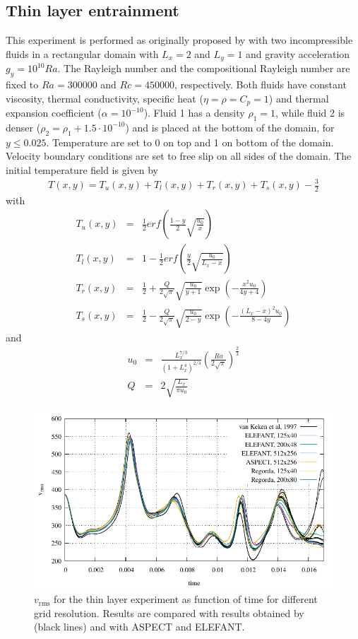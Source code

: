 \subsection{Thin layer entrainment}\label{sec:thin}
This experiment is performed as originally proposed by \citet{vanKeken1997} with two incompressible fluids in a rectangular domain with $L_x=2$ and $L_y=1$
and gravity acceleration $g_y=10^{10}Ra$. The Rayleigh number and the compositional Rayleigh number are fixed to $Ra=300000$ and $Rc=450000$, respectively.
Both fluids have constant viscosity, thermal conductivity, specific heat ($\eta=\rho=C_p=1$) and thermal expansion coefficient ($\alpha=10^{-10}$). Fluid 1
has a density $\rho_1=1$, while fluid 2 is denser ($\rho_2=\rho_1+1.5 \cdot 10^{-10}$) and is placed at the bottom of the domain, for $y \leq 0.025$.
Temperature are set to 0 on top and 1 on bottom of the domain. Velocity boundary conditions are set to free slip on all sides of the domain. The initial
temperature field is given by
\begin{eqnarray}
T(x,y)=T_u(x,y)+T_l(x,y)+T_r(x,y)+T_s(x,y)-\frac{3}{2}\nonumber
\end{eqnarray}
with
\begin{eqnarray}
T_u(x,y)&=&\frac{1}{2}erf\left(\frac{1-y}{2}\sqrt{\frac{u_0}{x}}\right)\nonumber \\
T_l(x,y)&=&1-\frac{1}{2}erf\left(\frac{y}{2}\sqrt{\frac{u_0}{L_x-x}}\right)\nonumber \\
T_r(x,y)&=&\frac{1}{2}+\frac{Q}{2\sqrt{\pi}}\sqrt{\frac{u_0}{y+1}} \exp\left(-\frac{x^2u_0}{4y+4}\right)\nonumber \\
T_s(x,y)&=&\frac{1}{2}-\frac{Q}{2\sqrt{\pi}}\sqrt{\frac{u_0}{2-y}} \exp\left(-\frac{(L_x-x)^2u_0}{8-4y}\right)\nonumber
\end{eqnarray}
and
\begin{eqnarray}
u_0&=&\frac{L_x^{7/3}}{(1+L_x^4)^{2/3}}\left(\frac{Ra}{2\sqrt{\pi}}\right)^{\frac{2}{3}}\nonumber \\
Q&=&2\sqrt{\frac{L_x}{\pi u_0}}\nonumber
\end{eqnarray}
\begin{figure}[h!]
\centering
\includegraphics[width=12cm]{./Figures/vrms_thin.pdf}
\caption{$v_{\textrm{rms}}$ for the thin layer experiment as function of time for different grid resolution. Results are compared with results obtained by
\citet{vanKeken1997} (black lines) and with ASPECT and ELEFANT.}
\label{fig:thin}
\end{figure}

